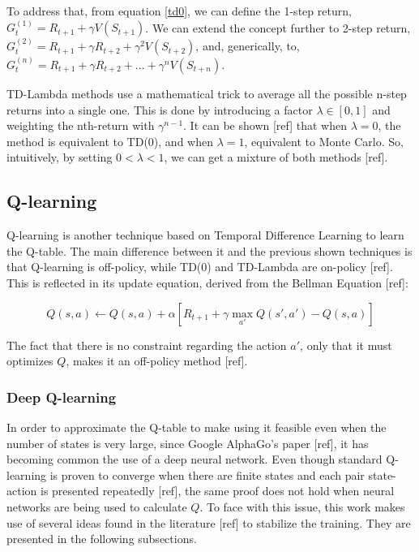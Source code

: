 \documentclass[11pt,twoside]{article}
\begin{document}
To address that, from equation \ref{td0}, we can define the 1-step return, $G_t^{(1)} = R_{t+1} + \gamma V(S_{t+1})$. We can extend the concept further to 2-step return, $G_t^{(2)} = R_{t+1} + \gamma R_{t+2} + \gamma^2 V(S_{t+2})$, and, generically, to, $G_t^{(n)} = R_{t+1} + \gamma R_{t+2} + \ldots + \gamma^n V(S_{t+n})$. 

TD-Lambda methods use a mathematical trick to average all the possible n-step returns into a single one. This is done by introducing a factor $\lambda \in [0, 1]$ and weighting the nth-return with $\gamma^{n-1}$. It can be shown [ref] that when $\lambda = 0$, the method is equivalent to TD(0), and when $\lambda = 1$, equivalent to Monte Carlo. So, intuitively, by setting $0 < \lambda < 1$, we can get a mixture of both methods [ref].

\subsection{Q-learning}

Q-learning is another technique based on Temporal Difference Learning to learn the Q-table. The main difference between it and the previous shown techniques is that Q-learning is off-policy, while TD(0) and TD-Lambda are on-policy [ref]. This is reflected in its update equation, derived from the Bellman Equation [ref]:

\begin{equation} \label{qlearning}
	Q(s, a) \leftarrow Q(s, a) + \alpha [R_{t+1} + \gamma \max_{a'} Q(s', a') - Q(s,a)]
\end{equation}

The fact that there is no constraint regarding the action $a'$, only that it must optimizes $Q$, makes it an off-policy method [ref].

\subsubsection{Deep Q-learning}


In order to approximate the Q-table to make using it feasible even when the number of states is very large, since Google AlphaGo's paper [ref], it has becoming common the use of a deep neural network. Even though standard Q-learning is proven to converge when there are finite states and each pair state-action is presented repeatedly [ref], the same proof does not hold when neural networks are being used to calculate $Q$. To face with this issue, this work makes use of several ideas found in the literature [ref] to stabilize the training. They are presented in the following subsections.
\end{document}

